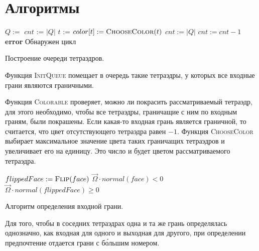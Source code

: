 \chapter{Алгоритмы}

\begin{algorithm}[ht!]
\centering
\begin{algorithmic}[1]
\State $Q := $ 
\State $cnt$ := $|Q|$
\State $t$ := 
\State $color[t] := \Call{ChooseColor}{t}$
\State {}
\EndFor
\State $cnt := |Q|$
\Else
\State {}
\State $cnt := cnt - 1$
\EndIf
{}
\State \textbf{error} Обнаружен цикл
\EndIf
\EndWhile
\EndFunction
\end{algorithmic}
\caption{Построение очереди тетраэдров.}
\label{alg:1}
\end{algorithm}

Функция \textsc{InitQueue} помещает в очередь такие тетраэдры, у которых все входные грани являются граничными.

Функция \textsc{Colorable} проверяет, можно ли покрасить рассматриваемый тетраэдр, для этого необходимо, чтобы все тетраэдры, граничащие с ним по входным граням, были покрашены. Если какая-то входная грань является граничной, то считается, что цвет отсутствующего тетраэдра равен $-1$. Функция \textsc{ChooseColor} выбирает максимальное значение цвета таких граничащих тетраэдров и увеличивает его на единицу. Это число и будет цветом рассматриваемого тетраэдра. 

\begin{algorithm}[ht!]
\centering
\begin{algorithmic}[1]
\State $flippedFace := \Call{Flip}{face}$
\State \Return $\vec \Omega \cdot normal(face) < 0$
\Else 
\State\Return $\vec \Omega \cdot normal(flippedFace) \geqslant 0$
\EndIf
\EndFunction
\end{algorithmic}
\caption{Алгоритм определения входной грани.}
\label{alg:2}
\end{algorithm}

Для того, чтобы в соседних тетраэдрах одна и та же грань определялась однозначно, как входная для одного и выходная для другого, при определении предпочтение отдается грани с б\'{о}льшим номером.
